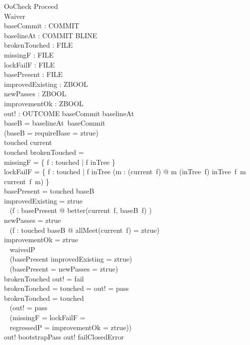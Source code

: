 \documentclass[a4paper,10pt,fleqn]{article}
\begin{document}
\begin{schema}{OoCheck}
Proceed \\
Waiver \\
baseCommit : COMMIT \\
baselineAt : COMMIT \pfun BLINE \\
brokenTouched : \finset FILE \\
missingF : \finset FILE \\
lockFailF : \finset FILE \\
basePresent : \finset FILE \\
improvedExisting : ZBOOL \\
newPasses : ZBOOL \\
improvementOk : ZBOOL \\
out! : OUTCOME
\where
baseCommit \in \dom baselineAt \\
baseB = baselineAt~baseCommit \\
\lnot (baseB = \emptyset \land requireBase = ztrue) \\
touched \subseteq \dom current \\
touched \cap brokenTouched = \emptyset \\
missingF = \{ f : touched | f \notin \dom inTree \} \\
lockFailF = \{ f : touched | f \in \dom inTree \land (\exists m : \dom (current~f) @ m \notin \dom (inTree~f) \lor inTree~f~m \neq current~f~m) \} \\
basePresent = touched \cap \dom baseB \\
improvedExisting = ztrue \iff \\
\quad~ (\exists f : basePresent @ better(current~f, baseB~f) \neq \emptyset) \\
newPasses = ztrue \iff \\
\quad~ (\exists f : touched \setminus \dom baseB @ allMeet(current~f) = ztrue) \\
improvementOk = ztrue \iff \\
\quad~ waivedP \neq \emptyset \\
\quad~ \lor (basePresent \neq \emptyset \land improvedExisting = ztrue) \\
\quad~ \lor (basePresent = \emptyset \land newPasses = ztrue) \\
brokenTouched \neq \emptyset \implies out! = fail \\
brokenTouched = \emptyset \land touched = \emptyset \implies out! = pass \\
brokenTouched = \emptyset \land touched \neq \emptyset \implies \\
\quad~ (out! = pass \iff \\
\quad~ (missingF = \emptyset \land lockFailF = \emptyset \\
\quad~ \land regressedP = \emptyset \land improvementOk = ztrue)) \\
out! \neq bootstrapPass \land out! \neq failClosedError
\end{schema}
\end{document}
